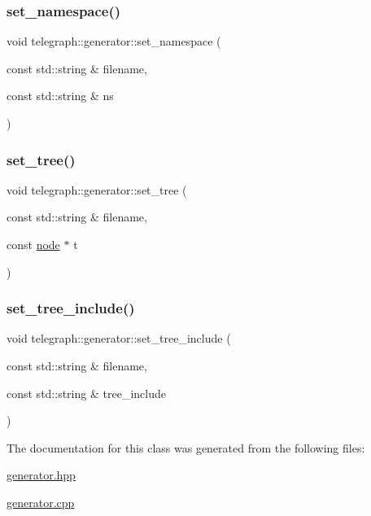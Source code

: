 \mbox{\label{classtelegraph_1_1generator_a51756531241b5bc309736fc9fc5eba39}} 
\subsubsection{\texorpdfstring{set\+\_\+namespace()}{set\_namespace()}}
{\footnotesize\ttfamily void telegraph\+::generator\+::set\+\_\+namespace (\begin{DoxyParamCaption}\item[{const std\+::string \&}]{filename,  }\item[{const std\+::string \&}]{ns }\end{DoxyParamCaption})}

\mbox{\label{classtelegraph_1_1generator_ab9540639f075db70b2763fbe7c462a94}} 
\subsubsection{\texorpdfstring{set\+\_\+tree()}{set\_tree()}}
{\footnotesize\ttfamily void telegraph\+::generator\+::set\+\_\+tree (\begin{DoxyParamCaption}\item[{const std\+::string \&}]{filename,  }\item[{const \hyperlink{classtelegraph_1_1node}{node} $\ast$}]{t }\end{DoxyParamCaption})}

\mbox{\label{classtelegraph_1_1generator_ac2e6da6fff01552c4084d27310dba3da}} 
\subsubsection{\texorpdfstring{set\+\_\+tree\+\_\+include()}{set\_tree\_include()}}
{\footnotesize\ttfamily void telegraph\+::generator\+::set\+\_\+tree\+\_\+include (\begin{DoxyParamCaption}\item[{const std\+::string \&}]{filename,  }\item[{const std\+::string \&}]{tree\+\_\+include }\end{DoxyParamCaption})}



The documentation for this class was generated from the following files\+:\begin{DoxyCompactItemize}
\item 
\hyperlink{generator_8hpp}{generator.\+hpp}\item 
\hyperlink{generator_8cpp}{generator.\+cpp}\end{DoxyCompactItemize}
